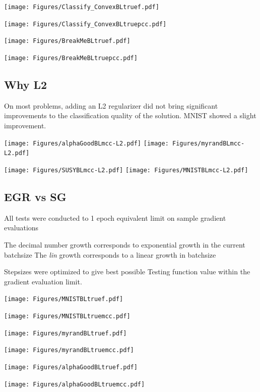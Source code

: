 \documentclass[11pt]{article}
\begin{document}
     \newpage 
	 
\texttt{[image: Figures/Classify\_ConvexBLtruef.pdf]} 

\texttt{[image: Figures/Classify\_ConvexBLtruepcc.pdf]} 



     \newpage 
     
\texttt{[image: Figures/BreakMeBLtruef.pdf]} 

\texttt{[image: Figures/BreakMeBLtruepcc.pdf]} 


\subsection{Why L2}

On most problems, adding an L2 regularizer did not bring significant improvements to the classification quality of the solution. MNIST showed a slight improvement.

     
\texttt{[image: Figures/alphaGoodBLmcc-L2.pdf]} 
\texttt{[image: Figures/myrandBLmcc-L2.pdf]} 

\texttt{[image: Figures/SUSYBLmcc-L2.pdf]} 
\texttt{[image: Figures/MNISTBLmcc-L2.pdf]} 

\subsection{EGR vs SG}

All tests were conducted to 1 epoch equivalent limit on sample gradient evaluations

The decimal number growth corresponds to exponential growth in the current batchsize
The \emph{lin} growth corresponds to a linear growth in batchsize

Stepsizes were optimized to give best possible Testing function value within the gradient evaluation limit. 

 \newpage
     
\texttt{[image: Figures/MNISTBLtruef.pdf]} 

\texttt{[image: Figures/MNISTBLtruemcc.pdf]} 
     
\texttt{[image: Figures/myrandBLtruef.pdf]} 

\texttt{[image: Figures/myrandBLtruemcc.pdf]} 
     
\texttt{[image: Figures/alphaGoodBLtruef.pdf]} 

\texttt{[image: Figures/alphaGoodBLtruemcc.pdf]} 
     
\end{document}
